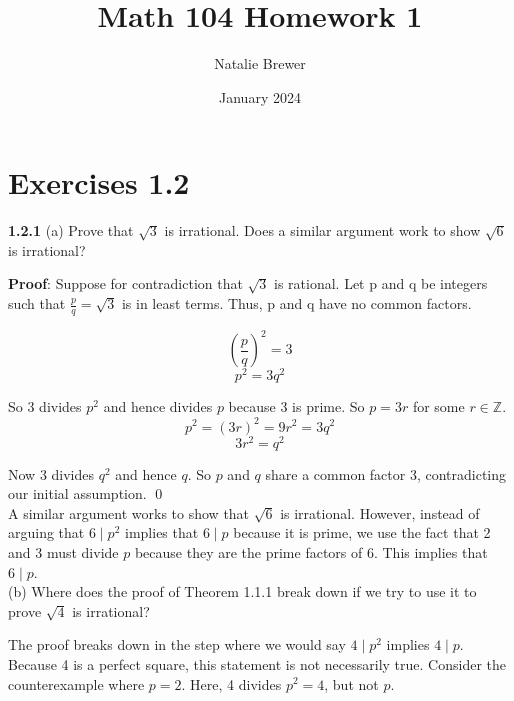 \documentclass{article}
\title{Math 104 Homework 1}
\author{Natalie Brewer}
\date{January 2024}
\begin{document}
\maketitle

\section{Exercises 1.2}
\textbf{1.2.1}
(a) Prove that $\sqrt{3}$ is irrational. Does a similar argument work to show $\sqrt{6}$ is irrational?

\textbf{Proof}: Suppose for contradiction that $\sqrt{3}$ is rational. Let p and q be integers such that  $\frac{p}{q} = \sqrt{3}$ is in least terms. Thus, p and q have no common factors.

    \begin{equation}
        \left( \frac{p}{q} \right)^2 = 3
    \end{equation}
    \begin{equation}
        p^2 = 3q^2
    \end{equation}

So 3 divides $p^2$ and hence divides $p$ because 3 is prime. So $p = 3r$ for some $r \in \mathbb{Z}$.
    \begin{equation}
        p^2 = (3r)^2 = 9r^2 = 3q^2
    \end{equation}
    \begin{equation}
        3r^2 = q^2
    \end{equation}

Now 3 divides $q^2$ and hence $q$. So $p$ and $q$ share a common factor 3, contradicting our initial assumption. \qed\\

A similar argument works to show that $\sqrt{6}$ is irrational. However, instead of arguing that $6 \mid p^2$ implies that $6 \mid p$ because it is prime, we use the fact that 2 and 3 must divide $p$ because they are the prime factors of 6. This implies that $6 \mid p$. \\

(b) Where does the proof of Theorem 1.1.1 break down if we try to use it to prove $\sqrt{4}$ is irrational?

The proof breaks down in the step where we would say $4 \mid p^2$ implies $4 \mid p$. Because 4 is a perfect square, this statement is not necessarily true. Consider the counterexample where $p = 2$. Here, 4 divides $p^2 = 4$, but not $p$.\\
\end{document}
